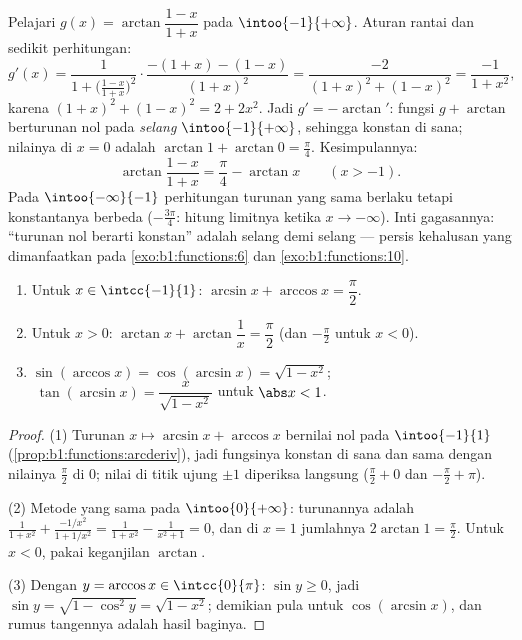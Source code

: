 \begin{example}\label{ex:b1:functions:hiddenconst}
Pelajari $g(x) = \arctan\dfrac{1 - x}{1 + x}$ pada $\intoo{-1}
{+\infty}$. Aturan rantai dan sedikit perhitungan:
\[
g'(x) = \frac{1}{1 + \bigl(\frac{1-x}{1+x}\bigr)^2}\cdot
\frac{-(1+x) - (1-x)}{(1+x)^2}
= \frac{-2}{(1+x)^2 + (1-x)^2}
= \frac{-1}{1 + x^2} ,
\]
karena $(1+x)^2 + (1-x)^2 = 2 + 2x^2$. Jadi $g' = -\arctan'$: fungsi
$g + \arctan$ berturunan nol pada \emph{selang}
$\intoo{-1}{+\infty}$, sehingga konstan di sana; nilainya di $x =
0$ adalah $\arctan 1 + \arctan 0 = \frac\pi4$. Kesimpulannya:
\[
\arctan\frac{1 - x}{1 + x} = \frac\pi4 - \arctan x
\qquad (x > -1) .
\]
Pada $\intoo{-\infty}{-1}$ perhitungan turunan yang sama berlaku tetapi
konstantanya berbeda ($-\frac{3\pi}4$: hitung limitnya ketika
$x \to -\infty$). Inti gagasannya: ``turunan nol berarti
konstan'' adalah  selang demi selang --- persis
kehalusan yang dimanfaatkan pada \cref{exo:b1:functions:6} dan
\cref{exo:b1:functions:10}.
\end{example}

\begin{proposition}\label{prop:b1:functions:arcidentities}
\begin{enumerate}
  \item Untuk $x \in \intcc{-1}{1}$: $\arcsin x + \arccos x =
        \dfrac{\pi}{2}$.
  \item Untuk $x > 0$: $\arctan x + \arctan\dfrac 1x = \dfrac{\pi}{2}$
        (dan $-\frac\pi2$ untuk $x < 0$).
  \item $\sin(\arccos x) = \cos(\arcsin x) = \sqrt{1 - x^2}$;
        $\;\tan(\arcsin x) = \dfrac{x}{\sqrt{1 - x^2}}$ untuk
        $\abs x < 1$.
\end{enumerate}
\end{proposition}

\begin{proof}
(1) Turunan $x \mapsto \arcsin x + \arccos x$ bernilai nol pada
$\intoo{-1}{1}$ (\cref{prop:b1:functions:arcderiv}), jadi fungsinya
konstan di sana dan sama dengan nilainya $\frac\pi2$ di $0$; nilai di titik
ujung $\pm 1$ diperiksa langsung ($\frac\pi2 + 0$ dan $-\frac\pi2 +
\pi$).

(2) Metode yang sama pada $\intoo{0}{+\infty}$: turunannya adalah
$\frac{1}{1+x^2} + \frac{-1/x^2}{1 + 1/x^2} = \frac{1}{1+x^2} -
\frac{1}{x^2 + 1} = 0$, dan di $x = 1$ jumlahnya $2\arctan 1 =
\frac\pi2$. Untuk $x < 0$, pakai keganjilan $\arctan$.

(3) Dengan $y = \arccos x \in \intcc{0}{\pi}$: $\sin y \geq 0$, jadi
$\sin y = \sqrt{1 - \cos^2 y} = \sqrt{1 - x^2}$; demikian pula untuk
$\cos(\arcsin x)$, dan rumus tangennya adalah hasil baginya.
\end{proof}

